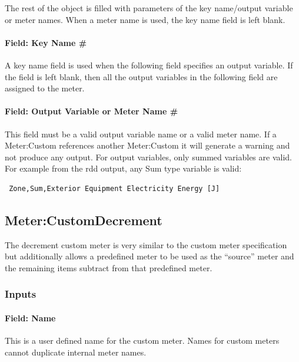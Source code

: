 The rest of the object is filled with parameters of the key name/output variable or meter names. When a meter name is used, the key name field is left blank.

\paragraph{Field: Key Name \#}\label{field-key-name}

A key name field is used when the following field specifies an output variable. If the field is left blank, then all the output variables in the following field are assigned to the meter.

\paragraph{Field: Output Variable or Meter Name \#}\label{field-output-variable-or-meter-name}

This field must be a valid output variable name or a valid meter name. If a Meter:Custom references another Meter:Custom it will generate a warning and not produce any output.
For output variables, only summed variables are valid. For example from the rdd output, any Sum type variable is valid:
\begin{lstlisting}
 Zone,Sum,Exterior Equipment Electricity Energy [J]
\end{lstlisting}


\subsection{Meter:CustomDecrement}\label{metercustomdecrement}

The decrement custom meter is very similar to the custom meter specification but additionally allows a predefined meter to be used as the ``source'' meter and the remaining items subtract from that predefined meter.

\subsubsection{Inputs}\label{inputs-18-008}

\paragraph{Field: Name}\label{field-name-1-040}

This is a user defined name for the custom meter. Names for custom meters cannot duplicate internal meter names.

